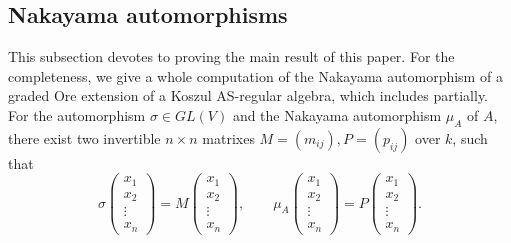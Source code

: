 \documentclass[a4paper,10pt]{amsart}
\theoremstyle{definition}
\numberwithin{equation}{section}
\begin{document}
\subsection{Nakayama automorphisms}
This subsection devotes to proving the main result of this paper. For the completeness, we give a whole computation of the Nakayama automorphism of a graded Ore extension of a Koszul AS-regular algebra, which includes \cite[Proposition 3.15]{ZVZ} partially. For the automorphism $\sigma\in GL(V)$ and the Nakayama automorphism $\mu_A$ of $A$, there exist two invertible $n\times n$ matrixes $M=(m_{ij}),P=(p_{ij})$ over $k$, such that
$$\sigma
\left(
\begin{array}{c}
x_1\\
x_2\\
\vdots\\
x_n
\end{array}
\right)=M\left(
\begin{array}{c}
x_1\\
x_2\\
\vdots\\
x_n
\end{array}
\right),\qquad
\mu_A
\left(
\begin{array}{c}
x_1\\
x_2\\
\vdots\\
x_n
\end{array}
\right)=P\left(
\begin{array}{c}
x_1\\
x_2\\
\vdots\\
x_n
\end{array}
\right).
$$
\end{document}
